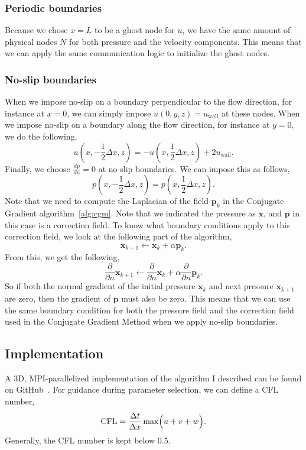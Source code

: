 \documentclass[fleqn,a4paper]{article} %
\numberwithin{equation}{section} %
\numberwithin{figure}{section} %
\numberwithin{algorithm}{section} %
\begin{document}
\subsubsection{Periodic boundaries}
Because we chose $x = L$ to be a ghost node for $u$, we have the same amount of physical nodes $N$ for both pressure and the velocity components. This means that we can apply the same communication logic to initialize the ghost nodes. 
\subsubsection{No-slip boundaries}
When we impose no-slip on a boundary perpendicular to the flow direction, for instance at $x = 0$, we can simply impose $u(0, y, z) = u_\text{wall}$ at these nodes. When we impose no-slip on a boundary along the flow direction, for instance at $y = 0$, we do the following,
\begin{equation}
    u\left(x, -\frac12 \Delta x, z\right) = -u\left(x, \frac12 \Delta x, z\right) + 2 u_\text{wall}.
\end{equation}
Finally, we choose $\frac{d p}{d n} = 0$ at no-slip boundaries. We can impose this as follows,
\begin{equation}
    p\left(x, -\frac12 \Delta x, z\right) = p\left(x, \frac12 \Delta x, z\right).
\end{equation}
Note that we need to compute the Laplacian of the field $\bm{p}_k$ in the Conjugate Gradient algorithm~\ref{alg:cgm}. Note that we indicated the pressure as $\bm{x}$, and $\bm{p}$ in this case is a correction field. To know what boundary conditions apply to this correction field, we look at the following part of the algorithm,
\begin{equation}
    \bm{x}_{k+1} \gets \bm{x}_k + \alpha \bm{p}_k. 
\end{equation}
From this, we get the following,
\begin{equation}
    \frac{\partial}{\partial n}\bm{x}_{k+1} \gets \frac{\partial}{\partial n}\bm{x}_k + \alpha \frac{\partial}{\partial n}\bm{p}_k. 
\end{equation}
So if both the normal gradient of the initial pressure $\bm{x}_k$ and next pressure $\bm{x}_{k+1}$ are zero, then the gradient of $\bm{p}$ must also be zero. This means that we can use the same boundary condition for both the pressure field and the correction field used in the Conjugate Gradient Method when we apply no-slip boundaries. 
\subsection{Implementation}
A 3D, MPI-parallelized implementation of the algorithm I described can be found on GitHub~\cite{code}. For guidance during parameter selection, we can define a CFL number,
\begin{equation}
    \text{CFL} = \frac{\Delta t}{\Delta x}\max \Bigl(u + v + w\Bigr).
\end{equation}
Generally, the CFL number is kept below 0.5. 
\clearpage
\end{document}
